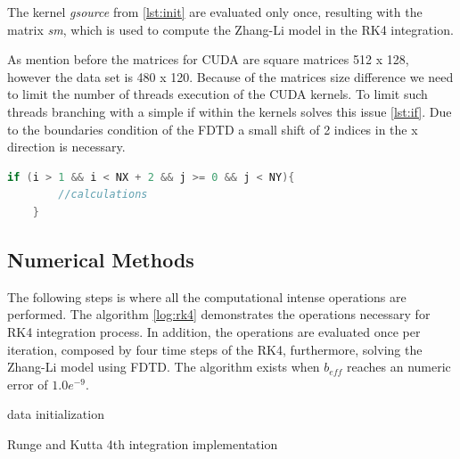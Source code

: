 The kernel \textit{gsource} from \ref{lst:init} are evaluated only once,  resulting with the matrix \textit{sm}, which is used to compute the Zhang-Li model in the RK4 integration. 

As mention before the matrices for CUDA are square matrices 512 x 128, however the data set is 480 x 120. Because of the matrices size difference we need to limit the number of threads execution of the CUDA kernels. To limit such threads branching with a simple if within the kernels solves this issue \ref{lst:if}. Due to the boundaries condition of the FDTD a small shift of 2 indices in the x direction is necessary. 

\begin{lstlisting}[language=C++, label={lst:if}, caption={Laplacian X using global memory}]
    if (i > 1 && i < NX + 2 && j >= 0 && j < NY){
    	//calculations
    }
\end{lstlisting}

\subsection{Numerical Methods}

The following steps is where all the computational intense operations are performed. The algorithm \ref{log:rk4} demonstrates the operations necessary for RK4 integration process. In addition, the operations are evaluated once per iteration, composed by four time steps of the RK4, furthermore, solving the Zhang-Li model using  FDTD. The algorithm exists when $b_{eff}$ reaches an numeric error of $1.0e^{-9}$.

\begin{algorithm}[H]
 data initialization\;
 \label{log:rk4}
 \caption{Runge and Kutta 4th integration implementation}
\end{algorithm}

